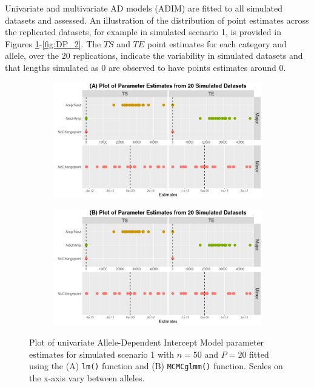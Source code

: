 Univariate and multivariate AD models (ADIM) are fitted to all simulated datasets and assessed. An illustration of the distribution of point estimates across the replicated datasets, for example in simulated scenario 1, is provided in Figures \ref{fig:DP_1}-\ref{fig:DP_2}. The $TS$ and $TE$ point estimates for each category and allele, over the 20 replications, indicate the variability in simulated datasets and that lengths simulated as 0 are observed to have points estimates around 0.

\begin{figure}[!ht]
\vspace{0.5cm}
     \begin{subfigure}[t]{.49\textwidth}
      \centering
     \includegraphics[width = 1\textwidth]{../figures/Chapter_5/Uni_lm_Prediction_Simulation.png}
    \end{subfigure}%
     \begin{subfigure}[t]{.49\textwidth}
      \centering
       \includegraphics[width = 1\textwidth]{../figures/Chapter_5/Uni_MCMC_Prediction_Simulation.png}
    \end{subfigure} 
     \caption[Plot of univariate Allele-Dependent Intercept Model parameter estimates for simulated scenario 1 with $n = 50$ and $P = 20$.]{Plot of univariate Allele-Dependent Intercept Model parameter estimates for simulated scenario 1 with $n = 50$ and $P = 20$ fitted using the (A) \texttt{lm()} function and (B) \texttt{MCMCglmm()} function. Scales on the x-axis vary between alleles.}
     \label{fig:DP_1}
\end{figure}

